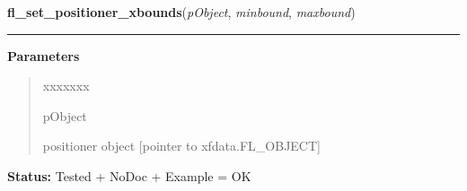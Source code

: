 \hspace{.8\funcindent}\begin{boxedminipage}{\funcwidth}

    \raggedright \textbf{fl\_set\_positioner\_xbounds}(\textit{pObject}, \textit{minbound}, \textit{maxbound})

    \vspace{-1.5ex}

    \rule{\textwidth}{0.5\fboxrule}
\setlength{\parskip}{2ex}
\setlength{\parskip}{1ex}
      \textbf{Parameters}
      \vspace{-1ex}

      \begin{quote}
        \begin{Ventry}{xxxxxxx}

          \item[pObject]

          positioner object [pointer to xfdata.FL\_OBJECT]

        \end{Ventry}

      \end{quote}

\textbf{Status:} Tested + NoDoc + Example = OK



    \end{boxedminipage}

    \label{xformslib:library:fl_get_positioner_xbounds}

    \vspace{0.5ex}

